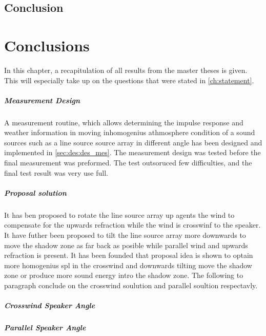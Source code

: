 \section{Conclusion}\label{sec:conclusion}


\chapter{Conclusions}
In this chapter, a recapitulation of all results from the master theses is given. This will especially take up on the questions that were stated in \autoref{ch:statement}.

\paragraph{Measurement Design}
A measurement routine, which allows determining the impulse response and weather information in moving inhomogenius athmosphere condition of a sound sources such as a line source source array in different angle has been designed and implemented in \autoref{sec:des:des_mes}. The measurement design was tested before the final measurement was preformed. The test outsoruced few difficulties, and the final test result was very use full.  




\paragraph{Proposal solution}
It has ben proposed to rotate the line source array up agents the wind to compensate for the upwards refraction while the wind is crosswinf to the speaker. It have futher been proposed to tilt the line source array more downwards to move the shadow zone as far back as posible while parallel wind and upwards refraction is present. It has been founded that proposal idea is shown to optain more homogenius \gls{spl} in the crosswind and downwards tilting move the shadow zone or produce more sound energy intro the shadow zone. The following to paragraph conclude on the crosswind soulution and parallel soultion respectavly.   




\paragraph{Crosswind Speaker Angle}


\paragraph{Parallel Speaker Angle}






